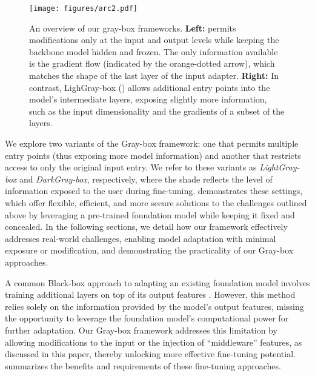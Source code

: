 \begin{figure*}[t]
	\centering
	\texttt{[image: figures/arc2.pdf]}
	\caption{An overview of our gray-box frameworks. {\bf Left:} \oursFull permits modifications only at the input and output levels while keeping the backbone model hidden and frozen. The only information available is the gradient flow (indicated by the orange-dotted arrow), which matches the shape of the last layer of the input adapter. {\bf Right:} In contrast, LighGray-box (\oursp) allows additional entry points into the model's intermediate layers, exposing slightly more information, such as the input dimensionality and the gradients of a subset of the layers.}
	\label{fig:arc}
    \vspace{-2mm}
\end{figure*}


We explore two variants of the Gray-box framework: one that permits multiple entry points (thus exposing more model information) and another that restricts access to only the original input entry. We refer to these variants as \emph{LightGray-box} and \emph{DarkGray-box}, respectively, where the shade reflects the level of information exposed to the user during fine-tuning.  demonstrates these settings, which offer flexible, efficient, and more secure solutions to the challenges outlined above by leveraging a pre-trained foundation model while keeping it fixed and concealed. In the following sections, we detail how our framework effectively addresses real-world challenges, enabling model adaptation with minimal exposure or modification, and demonstrating the practicality of our Gray-box approaches.

A common Black-box approach to adapting an existing foundation model involves training additional layers on top of its output features \citep{clip,BERT,he2022masked,DinoV2}. However, this method relies solely on the information provided by the model's output features, missing the opportunity to leverage the foundation model's computational power for further adaptation. Our Gray-box framework addresses this limitation by allowing modifications to the input or the injection of ``middleware'' features, as discussed in this paper, thereby unlocking more effective fine-tuning potential.
 summarizes the benefits and requirements of these fine-tuning approaches. 

